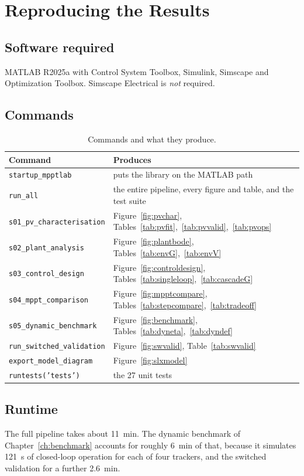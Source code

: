 \chapter{Reproducing the Results}
\label{app:repro}

\section{Software required}

MATLAB R2025a with Control System Toolbox, Simulink, Simscape and Optimization
Toolbox. Simscape Electrical is \emph{not} required.

\section{Commands}

\begin{table}[htbp]
\centering
\caption{Commands and what they produce.}
\label{tab:commands}
\small
\begin{tabular}{@{}L{0.38\textwidth}L{0.54\textwidth}@{}}
\toprule
\textbf{Command} & \textbf{Produces} \\
\midrule
\texttt{startup\_mpptlab} & puts the library on the MATLAB path \\
\texttt{run\_all} & the entire pipeline, every figure and table, and the test suite \\
\texttt{s01\_pv\_characterisation} & Figure~\ref{fig:pvchar}, Tables~\ref{tab:pvfit},~\ref{tab:pvvalid},~\ref{tab:pvops} \\
\texttt{s02\_plant\_analysis} & Figure~\ref{fig:plantbode}, Tables~\ref{tab:envG},~\ref{tab:envV} \\
\texttt{s03\_control\_design} & Figure~\ref{fig:controldesign}, Tables~\ref{tab:singleloop},~\ref{tab:cascadeG} \\
\texttt{s04\_mppt\_comparison} & Figure~\ref{fig:mpptcompare}, Tables~\ref{tab:stepcompare},~\ref{tab:tradeoff} \\
\texttt{s05\_dynamic\_benchmark} & Figure~\ref{fig:benchmark}, Tables~\ref{tab:dyneta},~\ref{tab:dyndef} \\
\texttt{run\_switched\_validation} & Figure~\ref{fig:swvalid}, Table~\ref{tab:swvalid} \\
\texttt{export\_model\_diagram} & Figure~\ref{fig:slxmodel} \\
\texttt{runtests('tests')} & the 27 unit tests \\
\bottomrule
\end{tabular}
\end{table}

\section{Runtime}

The full pipeline takes about \SI{11}{\minute}. The dynamic benchmark of
Chapter~\ref{ch:benchmark} accounts for roughly \SI{6}{\minute} of that, because
it simulates \SI{121}{\second} of closed-loop operation for each of four
trackers, and the switched validation for a further \SI{2.6}{\minute}.
